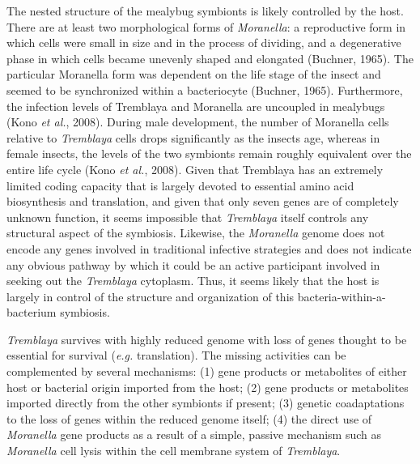 \documentclass[11pt]{article}
\begin{document}
\newline

The nested structure of the mealybug symbionts is likely controlled by the host. 
There are at least two morphological forms of \textit{Moranella}: a reproductive form in which cells were small in size and in the process of dividing, and a degenerative phase in which cells became unevenly shaped and elongated (Buchner, 1965). 
The particular Moranella form was dependent on the life stage of the insect and seemed to be synchronized within a bacteriocyte (Buchner, 1965). 
Furthermore, the infection levels of Tremblaya and Moranella are uncoupled in mealybugs (Kono \textit{et al.}, 2008). 
During male development, the number of Moranella cells relative to \textit{Tremblaya} cells drops significantly as the insects age, whereas in female insects, the levels of the two symbionts remain roughly equivalent over the entire life cycle (Kono \textit{et al.}, 2008). 
Given that Tremblaya has an extremely limited coding capacity that is largely devoted to essential amino acid biosynthesis and translation, and given that only seven genes are of completely unknown function, it seems impossible that \textit{Tremblaya} itself controls any structural aspect of the symbiosis. 
Likewise, the \textit{Moranella} genome does not encode any genes involved in traditional infective strategies and does not indicate any obvious pathway by which it could be an active participant involved in seeking out the \textit{Tremblaya} cytoplasm. 
Thus, it seems likely that the host is largely in control of the structure and organization of this bacteria-within-a-bacterium symbiosis.

\newline

\textit{Tremblaya} survives with highly reduced genome with loss of genes thought to be essential for survival (\textit{e.g.} translation). 
The missing activities can be complemented by several mechanisms: 
(1) gene products or metabolites of either host or bacterial origin imported from the host; 
(2) gene products or metabolites imported directly from the other symbionts if present; 
(3) genetic coadaptations to the loss of genes within the reduced genome itself; 
(4) the direct use of \textit{Moranella} gene products as a result of a simple, passive mechanism such as \textit{Moranella} cell lysis within the cell membrane system of \textit{Tremblaya}. 

\newline
\end{document}

